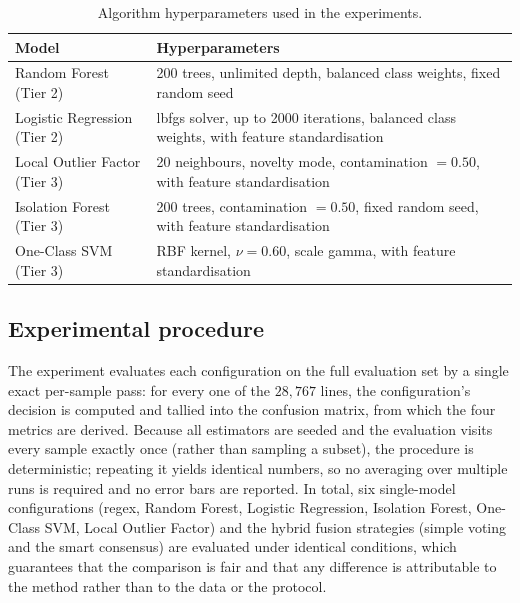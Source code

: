 \documentclass[../main.tex]{subfiles}
\begin{document}
\begin{table}[H]
  \centering
  \caption{Algorithm hyperparameters used in the experiments.}
  \label{tab:hyper}
  \renewcommand{\arraystretch}{1.35}
  \setlength{\tabcolsep}{8pt}
  \footnotesize
  \begin{tabular}{|l|p{8.2cm}|}
    \hline
    \textbf{Model} & \textbf{Hyperparameters} \\
    \hline
    Random Forest (Tier 2) & 200 trees, unlimited depth, balanced class
    weights, fixed random seed \\
    \hline
    Logistic Regression (Tier 2) & lbfgs solver, up to 2000 iterations,
    balanced class weights, with feature standardisation \\
    \hline
    Local Outlier Factor (Tier 3) & 20 neighbours, novelty mode,
    contamination $=0.50$, with feature standardisation \\
    \hline
    Isolation Forest (Tier 3) & 200 trees, contamination $=0.50$, fixed
    random seed, with feature standardisation \\
    \hline
    One-Class SVM (Tier 3) & RBF kernel, $\nu = 0.60$, scale gamma, with
    feature standardisation \\
    \hline
  \end{tabular}
\end{table}

\subsection{Experimental procedure}
\label{sec:sim-procedure}

The experiment evaluates each configuration on the full evaluation set by a
single exact per-sample pass: for every one of the $28{,}767$ lines, the
configuration's decision is computed and tallied into the confusion matrix,
from which the four metrics are derived. Because all estimators are seeded
and the evaluation visits every sample exactly once (rather than sampling a
subset), the procedure is deterministic; repeating it yields identical
numbers, so no averaging over multiple runs is required and no error bars are
reported. In total, six single-model configurations (regex, Random Forest,
Logistic Regression, Isolation Forest, One-Class SVM, Local Outlier Factor)
and the hybrid fusion strategies (simple voting and the smart consensus) are
evaluated under identical conditions, which guarantees that the comparison is
fair and that any difference is attributable to the method rather than to the
data or the protocol.
\end{document}

